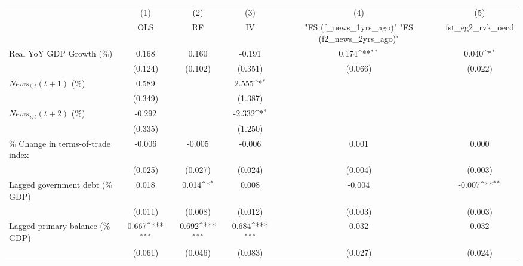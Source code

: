 {
\def\sym#1{\ifmmode^{#1}\else\(^{#1}\)\fi}
\begin{tabular}{l*{5}{c}}
\toprule
                    &\multicolumn{1}{c}{(1)}&\multicolumn{1}{c}{(2)}&\multicolumn{1}{c}{(3)}&\multicolumn{1}{c}{(4)}&\multicolumn{1}{c}{(5)}\\
                    &\multicolumn{1}{c}{OLS}&\multicolumn{1}{c}{RF}&\multicolumn{1}{c}{IV}&\multicolumn{1}{c}{ "FS (f_news_1yrs_ago)"  "FS (f2_news_2yrs_ago)" }&\multicolumn{1}{c}{fst_eg2_rvk_oecd}\\
\midrule
Real YoY GDP Growth (\%)&       0.168         &       0.160         &      -0.191         &       0.174\sym{**} &       0.040\sym{*}  \\
                    &     (0.124)         &     (0.102)         &     (0.351)         &     (0.066)         &     (0.022)         \\
\addlinespace
$ News_{i,t}(t+1)$ (\%)&       0.589         &                     &       2.555\sym{*}  &                     &                     \\
                    &     (0.349)         &                     &     (1.387)         &                     &                     \\
\addlinespace
$ News_{i,t}(t+2)$ (\%)&      -0.292         &                     &      -2.332\sym{*}  &                     &                     \\
                    &     (0.335)         &                     &     (1.250)         &                     &                     \\
\addlinespace
\% Change in terms-of-trade index&      -0.006         &      -0.005         &      -0.006         &       0.001         &       0.000         \\
                    &     (0.025)         &     (0.027)         &     (0.024)         &     (0.004)         &     (0.003)         \\
\addlinespace
Lagged government debt (\% GDP)&       0.018         &       0.014\sym{*}  &       0.008         &      -0.004         &      -0.007\sym{**} \\
                    &     (0.011)         &     (0.008)         &     (0.012)         &     (0.003)         &     (0.003)         \\
\addlinespace
Lagged primary balance (\% GDP)&       0.667\sym{***}&       0.692\sym{***}&       0.684\sym{***}&       0.032         &       0.032         \\
                    &     (0.061)         &     (0.046)         &     (0.083)         &     (0.027)         &     (0.024)         \\

\end{tabular}}
